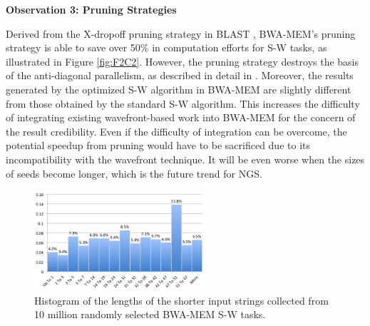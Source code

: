 \vspace{1pt}
\textbf{Observation 3: Pruning Strategies}
\vspace{1pt}

Derived from the X-dropoff pruning strategy in BLAST \cite{BLAST1990}, 
BWA-MEM's pruning strategy is able to save over 50\% in computation efforts for S-W tasks, as illustrated in Figure \ref{fig:F2C2}. 
However, the pruning strategy destroys the basis of the anti-diagonal parallelism, as described in detail in \cite{BWA-MEM}. 
Moreover, the results generated by the optimized S-W algorithm in BWA-MEM are slightly different from those obtained by the standard S-W algorithm. 
This increases the difficulty of integrating existing wavefront-based work into BWA-MEM for the concern of the result credibility. 
Even if the difficulty of integration can be overcome, 
the potential speedup from pruning would have to be sacrificed due to its incompatibility with the wavefront technique.
It will be even worse when the sizes of seeds become longer, which is the future trend for NGS.

\begin{figure}[!hbt]
	\begin{center}
		\includegraphics[width=2.5in]{Figures/Figure4C2.jpg}
		\caption {Histogram of the lengths of the shorter input strings collected from 10 million randomly selected BWA-MEM S-W tasks.}
		\label{fig:F4C2}
	\end{center}
\end{figure}
\vspace{-15pt}

